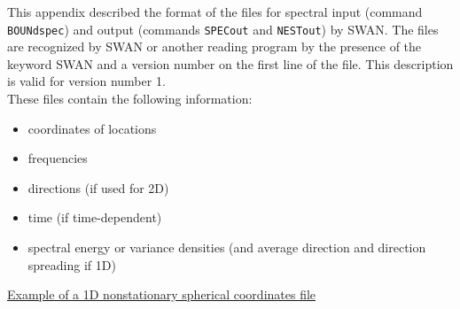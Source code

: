 \documentclass[12pt]{book}
\begin{document}
This appendix described the format of the files for spectral input (command {\tt BOUNdspec}) and output
(commands {\tt SPECout} and {\tt NESTout}) by SWAN. The files are recognized by SWAN or another reading program
by the presence of the keyword SWAN and a version number on the first line of the file. This description
is valid for version number 1.
\\[2ex]
\noindent
These files contain the following information:
\begin{itemize}
  \item coordinates of locations
  \item frequencies
  \item directions (if used for 2D)
  \item time (if time-dependent)
  \item spectral energy or variance densities (and average direction and direction spreading if 1D)
\end{itemize}

\noindent
\underline{Example of a 1D nonstationary spherical coordinates file}
\end{document}

